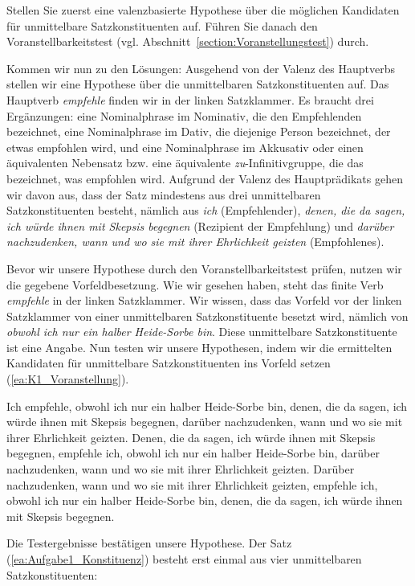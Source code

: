Stellen Sie zuerst eine valenzbasierte Hypothese über die möglichen Kandidaten für unmittelbare Satzkonstituenten auf. Führen Sie danach den Voranstellbarkeitstest 
(vgl. Abschnitt~\ref{section:Voranstellungstest}) durch.


Kommen wir nun zu den Lösungen: Ausgehend von der Valenz des Hauptverbs stellen wir eine Hypothese über die unmittelbaren Satzkonstituenten auf. Das Hauptverb \textit{empfehle} finden wir in der linken Satzklammer. Es braucht drei Ergänzungen: eine Nominalphrase im Nominativ, die den Empfehlenden bezeichnet, eine Nominalphrase im Dativ, die diejenige Person bezeichnet, der etwas empfohlen wird, und eine Nominalphrase im Akkusativ oder einen äquivalenten Nebensatz bzw. eine äquivalente \textit{zu}-Infinitivgruppe, die das bezeichnet, was empfohlen wird. Aufgrund der Valenz des Hauptprädikats gehen wir davon aus, dass der Satz mindestens aus drei unmittelbaren Satzkonstituenten besteht, nämlich aus \textit{ich} (Empfehlender), \textit{denen, die da sagen, ich würde ihnen mit Skepsis begegnen} (Rezipient der Empfehlung) und \textit{darüber nachzudenken, wann und wo sie mit ihrer Ehrlichkeit geizten} (Empfohlenes). 

Bevor wir unsere Hypothese durch den Voranstellbarkeitstest prüfen, nutzen wir die gegebene Vorfeldbesetzung. Wie wir gesehen haben, steht das finite Verb \textit{empfehle} in der linken Satzklammer. Wir wissen, dass das Vorfeld vor der linken Satzklammer von einer unmittelbaren Satzkonstituente besetzt wird, nämlich von \textit{obwohl ich nur ein halber Heide-Sorbe bin}. Diese unmittelbare Satzkonstituente ist eine Angabe. Nun testen wir unsere Hypothesen, indem wir die ermittelten Kandidaten für unmittelbare Satzkonstituenten ins Vorfeld setzen (\ref{ea:K1_Voranstellung}).

\ea \label{ea:K1_Voranstellung}
\ea \label{ea_K1_V1_1} Ich empfehle, obwohl ich nur ein halber Heide-Sorbe bin, denen, die da sagen, ich würde ihnen mit Skepsis begegnen, darüber nachzudenken, wann und wo sie mit ihrer Ehrlichkeit geizten.
\ex \label{ex_K1_V1_2} Denen, die da sagen, ich würde ihnen mit Skepsis begegnen, empfehle ich, obwohl ich nur ein halber Heide-Sorbe bin, darüber nachzudenken, wann und wo sie mit ihrer Ehrlichkeit geizten.
\ex \label{ex_K1_V1_3} Darüber nachzudenken, wann und wo sie mit ihrer Ehrlichkeit geizten, empfehle ich, obwohl ich nur ein halber Heide-Sorbe bin, denen, die da sagen, ich würde ihnen mit Skepsis begegnen.
\z 
\z 

Die Testergebnisse bestätigen unsere Hypothese. Der Satz (\ref{ea:Aufgabe1_Konstituenz}) besteht erst einmal aus vier unmittelbaren Satzkonstituenten:

